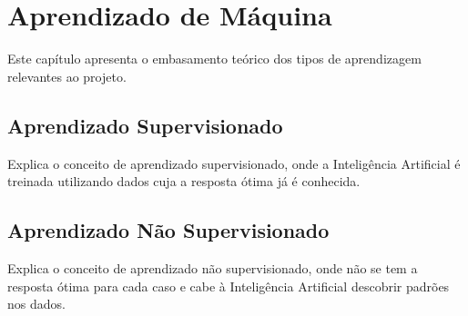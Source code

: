 \chapter{Aprendizado de Máquina}
\label{chap:cap1}
 
 Este capítulo apresenta o embasamento teórico dos tipos de aprendizagem relevantes ao projeto.
 

\section{Aprendizado Supervisionado}
\label{sec:superv}

 Explica o conceito de aprendizado supervisionado, onde a Inteligência Artificial é treinada utilizando dados cuja a resposta ótima já é conhecida.

\section{Aprendizado Não Supervisionado}
\label{sec:nsuperv}

 Explica o conceito de aprendizado não supervisionado, onde não se tem a resposta ótima para cada caso e cabe à Inteligência Artificial descobrir padrões nos dados.


